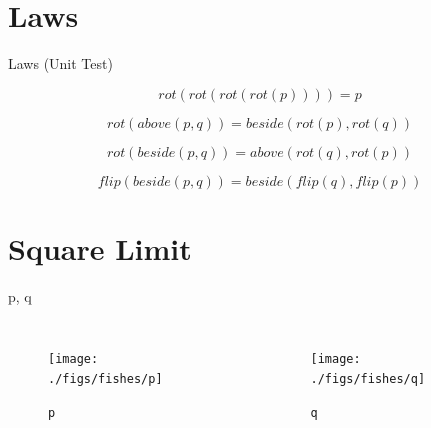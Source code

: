 \documentclass{beamer}
\begin{document}
    \section{Laws}

    \begin{frame}{Laws (Unit Test)}

        \begin{equation*}
        rot(rot(rot(rot(p)))) = p
        \end{equation*}

        \begin{equation*}
        rot(above(p, q)) = beside(rot(p), rot(q))
        \end{equation*}

        \begin{equation*}
        rot(beside(p, q)) = above(rot(q), rot(p))
        \end{equation*}

        \begin{equation*}
        flip(beside(p, q)) = beside(flip(q), flip(p))
        \end{equation*}
    \end{frame}

    \section{Square Limit}

    \begin{frame}{p, q}

        \begin{columns}[T,onlytextwidth]
                \begin{figure}
                    \centering
                    \texttt{[image: ./figs/fishes/p]}
                    \caption{\texttt{p}}
                    \label{fig:p}
                \end{figure}

                \begin{figure}
                    \centering
                    \texttt{[image: ./figs/fishes/q]}
                    \caption{\texttt{q}}
                    \label{fig:q}
                \end{figure}

        \end{columns}

    \end{frame}
\end{document}
